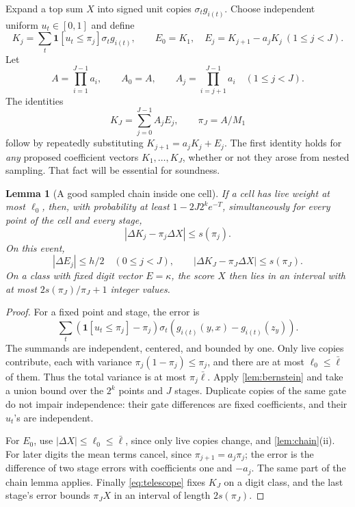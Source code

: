 \documentclass[11pt,letterpaper]{article}
\newtheorem{lemma}[theorem]{Lemma}
\theoremstyle{definition}
\theoremstyle{remark}
\newcommand{\ind}{\mathbf 1}
\newcommand{\abs}[1]{\left|#1\right|}
\begin{document}
Expand a top sum \(X\) into signed unit copies \(\sigma_tg_{i(t)}\).
Choose independent uniform \(u_t\in[0,1]\) and define
\[
 K_j=\sum_t\ind[u_t\le\pi_j]\sigma_tg_{i(t)},\qquad
 E_0=K_1,\quad E_j=K_{j+1}-a_jK_j\ (1\le j<J).
\]
Let
\[
 A=\prod_{i=1}^{J-1}a_i,\qquad A_0=A,\qquad
 A_j=\prod_{i=j+1}^{J-1}a_i\quad(1\le j<J).
\]
The identities
\begin{equation}\label{eq:telescope}
 K_J=\sum_{j=0}^{J-1}A_jE_j,\qquad \pi_J=A/M_1
\end{equation}
follow by repeatedly substituting \(K_{j+1}=a_jK_j+E_j\).
The first identity holds for \emph{any} proposed coefficient vectors
\(K_1,\ldots,K_J\), whether or not they arose from nested sampling.
That fact will be essential for soundness.

\begin{lemma}[A good sampled chain inside one cell]\label{lem:sampled}
If a cell has live weight at most \(\ell_0\), then, with probability
at least \(1-2J2^ke^{-T}\), simultaneously for every point of the
cell and every stage,
\[
 \abs{\Delta K_j-\pi_j\Delta X}\le s(\pi_j).
\]
On this event,
\[
 \abs{\Delta E_j}\le h/2\quad(0\le j<J),\qquad
 \abs{\Delta K_J-\pi_J\Delta X}\le s(\pi_J).
\]
On a class with fixed digit vector \(E=\kappa\), the score \(X\)
then lies in an interval with at most
\(2s(\pi_J)/\pi_J+1\) integer values.
\end{lemma}
\begin{proof}
For a fixed point and stage, the error is
\[
 \sum_t(\ind[u_t\le\pi_j]-\pi_j)\sigma_t
             (g_{i(t)}(y,x)-g_{i(t)}(z_y)).
\]
The summands are independent, centered, and bounded by one.
Only live copies contribute, each with variance
\(\pi_j(1-\pi_j)\le\pi_j\), and there are at most \(\ell_0\le\bar\ell\)
of them. Thus the total variance is at most
\(\pi_j\bar\ell\). Apply \cref{lem:bernstein} and take a union bound
over the \(2^k\) points and \(J\) stages. Duplicate copies of the
same gate do not impair independence: their gate differences are
fixed coefficients, and their \(u_t\)'s are independent.

For \(E_0\), use \(\abs{\Delta X}\le\ell_0\le\bar\ell\), since only live
copies change, and
\cref{lem:chain}(ii). For later digits the mean terms cancel, since
\(\pi_{j+1}=a_j\pi_j\); the error is the difference of two stage
errors with coefficients one and \(-a_j\). The same part of the
chain lemma applies. Finally \eqref{eq:telescope} fixes \(K_J\)
on a digit class, and the last stage's error bounds \(\pi_JX\)
in an interval of length \(2s(\pi_J)\).
\end{proof}
\end{document}
